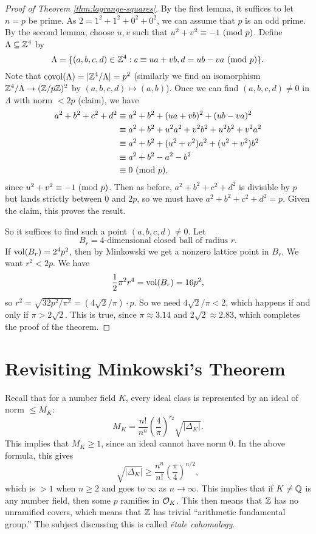 \begin{proof}[Proof of Theorem \ref{thm:lagrange-squares}]
  By the first lemma, it suffices to let $n = p$ be prime.
  As
  $2 = 1^2 + 1^2 + 0^2 + 0^2$,
  we can assume that $p$ is an odd prime. By the
  second lemma, choose $u, v$ such that $u^2 + v^2 \equiv -1 \ (\mathrm{mod}\ p)$.
  Define $\Lambda \subseteq \mathbb{Z}^4$ by
  \[
    \Lambda = \{(a, b, c, d) \in \mathbb{Z}^4 :
    c \equiv ua + vb, d = ub - va \ (\mathrm{mod}\ p)\}.
  \]
  Note that $\operatorname{covol}(\Lambda) = |\mathbb{Z}^4 / \Lambda| = p^2$
  (similarly we find an isomorphism $\mathbb{Z}^4 / \Lambda \to (\mathbb{Z} / p\mathbb{Z})^2$ by $(a, b, c, d) \mapsto (a, b)$).
  Once we can find $(a, b, c, d) \ne 0$ in $\Lambda$
  with norm $< 2p$ (claim), we have
  \begin{align*}
    a^2 + b^2 + c^2 + d^2
    &\equiv a^2 + b^2 + (ua + vb) ^2 + (ub - va)^2 \\
    &\equiv a^2 + b^2 + u^2 a^2 + v^2 b^2 + u^2 b^2 + v^2 a^2 \\
    &\equiv a^2 + b^2 + (u^2 + v^2)a^2 + (u^2 + v^2)b^2 \\
    &\equiv a^2 + b^2 - a^2 - b^2 \\
    &\equiv 0 \ (\mathrm{mod}\ p),
  \end{align*}
  since $u^2 + v^2 \equiv -1 \ (\mathrm{mod}\ p)$. Then as before,
  $a^2 + b^2 + c^2 + d^2$ is divisible by $p$ but
  lands strictly between $0$ and $2p$, so
  we must have $a^2 + b^2 + c^2 + d^2 = p$. Given the
  claim, this proves the result.

  So it suffices to
  find such a point $(a, b, c, d) \ne 0$. Let
  \[
    B_r = \text{4-dimensional closed ball of radius $r$}.
  \]
  If $\operatorname{vol}(B_r) = 2^4 p^2$, then by Minkowski we
  get a nonzero lattice point in $B_r$. We want $r^2 < 2p$.
  We have
  \[
    \frac{1}{2}\pi^2 r^4 = \operatorname{vol}(B_r) = 16p^2,
  \]
  so $r^2 = \sqrt{32p^2 / \pi^2} = (4\sqrt{2} / \pi) \cdot p$.
  So we need $4 \sqrt{2} / \pi < 2$, which happens if
  and only if $\pi > 2\sqrt{2}$. This is true, since
  $\pi \approx 3.14$ and $2\sqrt{2} \approx 2.83$, which
  completes the proof of the theorem.
\end{proof}

\section{Revisiting Minkowski's Theorem}

\begin{remark}
  Recall that for a number field $K$, every ideal class
  is represented by an ideal of norm $\le M_K$:
  \[
    M_K = \frac{n!}{n^n} \left(\frac{4}{\pi}\right)^{r_2} \sqrt{|\Delta_K|}.
  \]
  This implies that $M_K \ge 1$, since an ideal cannot
  have norm $0$. In the above formula, this gives
  \[
    \sqrt{|\Delta_K|} \ge \frac{n^n}{n!} \left(\frac{\pi}{4}\right)^{n / 2},
  \]
  which is $> 1$ when $n \ge 2$ and goes to $\infty$ as
  $n \to \infty$. This implies that if $K \ne \mathbb{Q}$ is
  any number field, then some $p$ ramifies in $\mathcal{O}_K$.
  This then means that $\mathbb{Z}$ has no unramified covers,
  which means that $\mathbb{Z}$ has trivial
  ``arithmetic fundamental group.'' The subject discussing
  this is called \emph{\'etale cohomology}.
\end{remark}

